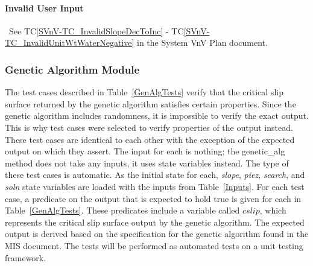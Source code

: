 \documentclass[12pt, titlepage]{article}
\newcommand{\tcref}[1]{TC\ref{#1}}
\begin{document}
\paragraph{Invalid User Input}
~\newline \noindent See \tcref{SVnV-TC_InvalidSlopeDecToInc} - 
\tcref{SVnV-TC_InvalidUnitWtWaterNegative} in the System VnV Plan document.

\subsubsection{Genetic Algorithm Module}

The test cases described in Table~\ref{GenAlgTests} 
verify that the critical slip surface returned by the genetic algorithm 
satisfies certain properties. Since the genetic algorithm includes randomness, 
it is impossible to verify the exact output. This is why test cases were 
selected to verify properties of the output instead. These test cases are 
identical to each other with the exception of the expected output on which they 
assert. The input for each is nothing; the genetic\_alg method does not take 
any inputs, it uses state variables instead. The type of these test cases is 
automatic. As the initial state for each, \textit{slope}, \textit{piez}, 
\textit{search}, and \textit{soln} state variables are loaded with the inputs 
from Table~\ref{Inputs}. For each test case, a predicate on the output that is 
expected to hold true is given for each in Table~\ref{GenAlgTests}. These 
predicates include a variable called $cslip$, which represents the critical 
slip surface output by the genetic algorithm. The expected output is derived 
based on the specification for the genetic algorithm found in the MIS document. 
The tests will be performed as automated tests on a unit testing framework.
\end{document}
